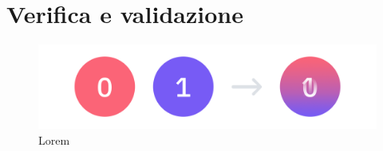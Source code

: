 \chapter{Verifica e validazione}
\label{cap:verifica-validazione}

\begin{figure}[h!]
    \centering
    \includegraphics[width=1\columnwidth]{img/quantum_superposition.png}
    \caption{Lorem}
    \label{fig:enter-label}
\end{figure}

\lipsum[1-2]